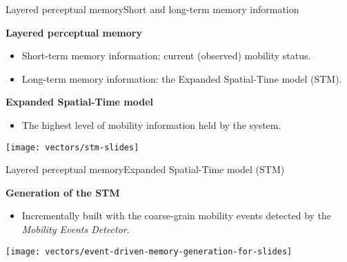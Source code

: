 \begin{frame}{Layered perceptual memory}{Short and long-term memory information}
\vspace{-0.25cm}
\small
\begin{block}{\small \textbf{Layered perceptual memory}}
\begin{itemize}
    \item Short-term memory information: current (observed) mobility status.
    \item Long-term memory information: the Expanded Spatial-Time model (STM).
\end{itemize}
\end{block}

\begin{block}{\small \textbf{Expanded Spatial-Time model}}
\begin{itemize}
  \item The highest level of mobility information held by the system.
\end{itemize}
{
  \centering
  \texttt{[image: vectors/stm-slides]}
\par }
\end{block}
\end{frame}

\begin{frame}{Layered perceptual memory}{Expanded Spatial-Time model (STM)}
\small
\begin{block}{\small \textbf{Generation of the STM}}
\begin{itemize}
    \item Incrementally built with the coarse-grain mobility events detected by the \emph{Mobility Events Detector}.
\end{itemize}
{
  \centering
  \texttt{[image: vectors/event-driven-memory-generation-for-slides]}
  \par
}
\end{block}
\end{frame}

